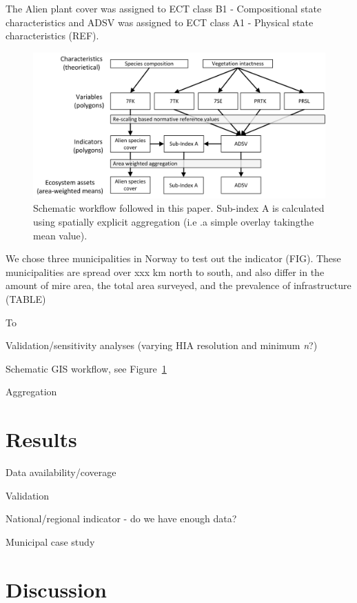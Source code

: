 \documentclass[
  super,
  preprint,
  3p]{elsarticle}
\begin{document}
The Alien plant cover was assigned to ECT class B1 - Compositional state
characteristics and ADSV was assigned to ECT class A1 - Physical state
characteristics (REF).

\begin{figure}

{\centering \includegraphics{../images/workflow.jpg}

}

\caption{\label{fig-workflow}Schematic workflow followed in this paper.
Sub-index A is calculated using spatially explicit aggregation (i.e .a
simple overlay takingthe mean value).}

\end{figure}

We chose three municipalities in Norway to test out the indicator (FIG).
These municipalities are spread over xxx km north to south, and also
differ in the amount of mire area, the total area surveyed, and the
prevalence of infrastructure (TABLE)

To

Validation/sensitivity analyses (varying HIA resolution and minimum
\emph{n}?)

Schematic GIS workflow, see Figure~\ref{fig-workflow}

Aggregation

\hypertarget{results}{%
\section{Results}\label{results}}

Data availability/coverage

Validation

National/regional indicator - do we have enough data?

Municipal case study

\hypertarget{discussion}{%
\section{Discussion}\label{discussion}}
\end{document}
